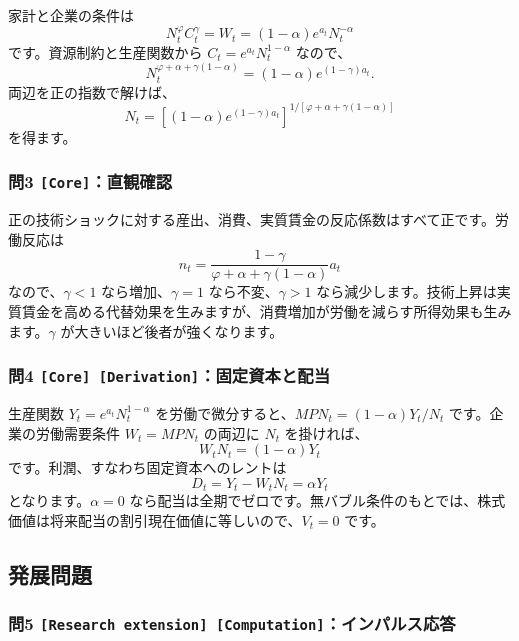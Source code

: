 \documentclass[
  japanese,
  lualatex,
  ja=standard,
  11pt,
  a4paper]{ltjsarticle}
\begin{document}
家計と企業の条件は \[
N_t^\varphi C_t^\gamma
=W_t
=(1-\alpha)e^{a_t}N_t^{-\alpha}
\] です。資源制約と生産関数から \(C_t=e^{a_t}N_t^{1-\alpha}\) なので、
\[
N_t^{\varphi+\alpha+\gamma(1-\alpha)}
=(1-\alpha)e^{(1-\gamma)a_t}.
\] 両辺を正の指数で解けば、 \[
N_t
=\left[(1-\alpha)e^{(1-\gamma)a_t}\right]^{
1/[\varphi+\alpha+\gamma(1-\alpha)]}
\] を得ます。

\subsubsection{\texorpdfstring{問3
\texttt{{[}Core{]}}：直観確認}{問3 {[}Core{]}：直観確認}}\label{ux554f3-coreux76f4ux89b3ux78baux8a8d}

正の技術ショックに対する産出、消費、実質賃金の反応係数はすべて正です。労働反応は
\[
n_t
=\frac{1-\gamma}{\varphi+\alpha+\gamma(1-\alpha)}a_t
\] なので、\(\gamma<1\) なら増加、\(\gamma=1\) なら不変、\(\gamma>1\)
なら減少します。技術上昇は実質賃金を高める代替効果を生みますが、消費増加が労働を減らす所得効果も生みます。\(\gamma\)
が大きいほど後者が強くなります。

\subsubsection{\texorpdfstring{問4
\texttt{{[}Core{]}\ {[}Derivation{]}}：固定資本と配当}{問4 {[}Core{]} {[}Derivation{]}：固定資本と配当}}\label{ux554f4-core-derivationux56faux5b9aux8cc7ux672cux3068ux914dux5f53}

生産関数 \(Y_t=e^{a_t}N_t^{1-\alpha}\)
を労働で微分すると、\(MPN_t=(1-\alpha)Y_t/N_t\) です。企業の労働需要条件
\(W_t=MPN_t\) の両辺に \(N_t\) を掛ければ、 \[
W_tN_t=(1-\alpha)Y_t
\] です。利潤、すなわち固定資本へのレントは \[
D_t=Y_t-W_tN_t=\alpha Y_t
\] となります。\(\alpha=0\)
なら配当は全期でゼロです。無バブル条件のもとでは、株式価値は将来配当の割引現在価値に等しいので、\(V_t=0\)
です。

\subsection{発展問題}\label{ux767aux5c55ux554fux984c-3}

\subsubsection{\texorpdfstring{問5
\texttt{{[}Research\ extension{]}\ {[}Computation{]}}：インパルス応答}{問5 {[}Research extension{]} {[}Computation{]}：インパルス応答}}\label{ux554f5-research-extension-computationux30a4ux30f3ux30d1ux30ebux30b9ux5fdcux7b54}
\end{document}
